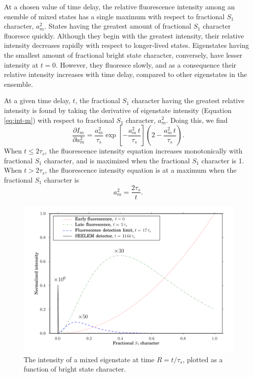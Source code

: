 \documentclass[12pt]{mitthesis}
\begin{document}
At a chosen value of time delay, the relative fluorescence intensity
among an enemble of mixed states has a single maximum with respect to
fractional $S_1$ character, $a_m^2$.  States having the
greatest amount of fractional $S_1$ character fluoresce
quickly.  Although they begin with the greatest intensity, their
relative intensity decreases rapidly with respect to longer-lived
states.  Eigenstates having the smallest amount of fractional bright
state character, conversely, have lesser intensity at $t=0$.  However,
they fluoresce slowly, and as a consequence their relative intensity
increases with time delay, compared to other eigenstates in the
ensemble.

At a given time delay, $t$, the fractional $S_1$ character having the
greatest relative intensity is found by taking the derivative of
eigenstate intensity (Equation \ref{eq:int-m}) with respect to
fractional $S_1$ character, $a_m^2$.  Doing this, we find
\begin{equation}
 \frac{ \partial I_m }{ \partial a_m^2 } =
   \frac{a_m^2}{\tau_s}
   \exp \left[
     -\frac{a_m^2 \, t}{\tau_s} 
   \right]
   \left (
     2 - \frac{a_m^2 \, t}{\tau_s}
   \right ).
\end{equation}
When $t \leq 2\tau_s$, the fluorescence intensity equation increases
monotonically with fractional $S_1$ character, and is maximized
when the fractional $S_1$ character is 1.  When $t > 2 \tau_s$,
the fluorescence intensity equation is at a maximum when the
fractional $S_1$ character is
\begin{equation}
  \label{eq:am-max}
  a_m^2 = \frac{2 \tau_s}{t}.
\end{equation}

\begin{figure}
  \caption{The intensity of a mixed eigenstate at time $R =
    t/\tau_s$, plotted as a function of bright
    state character.}
  \label{fig:int-at-rc}
  \centering
  \includegraphics[width=7.5in,angle=90]{intensity-at-delay.pdf}
\end{figure}
\end{document}
